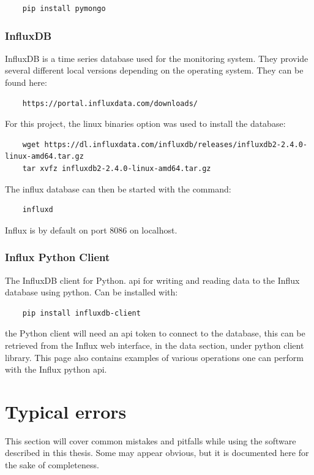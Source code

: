 \documentclass[main.tex]{subfiles}
\begin{document}
\begin{verbatim}
    pip install pymongo
\end{verbatim}

\subsubsection{InfluxDB}

InfluxDB is a time series database used for the monitoring system. They provide several different local versions depending on the operating system. They can be found here:
\begin{verbatim}
    https://portal.influxdata.com/downloads/
\end{verbatim}

For this project, the linux binaries option was used to install the database:
\begin{verbatim}
    wget https://dl.influxdata.com/influxdb/releases/influxdb2-2.4.0-linux-amd64.tar.gz
    tar xvfz influxdb2-2.4.0-linux-amd64.tar.gz
\end{verbatim}

The influx database can then be started with the command:

\begin{verbatim}
    influxd
\end{verbatim}

Influx is by default on port 8086 on localhost.

\subsubsection{Influx Python Client}
The InfluxDB client for Python. \gls{api} for writing and reading data to the Influx database using python. Can be installed with:

\begin{verbatim}
    pip install influxdb-client
\end{verbatim}

the Python client will need an \gls{api} token to connect to the database, this can be retrieved from the Influx web interface, in the data section, under python client library. This page also contains examples of various operations one can perform with the Influx python \gls{api}.

\section{Typical errors}

This section will cover common mistakes and pitfalls while using the software described in this thesis. Some may appear obvious, but it is documented here for the sake of completeness.
\end{document}
